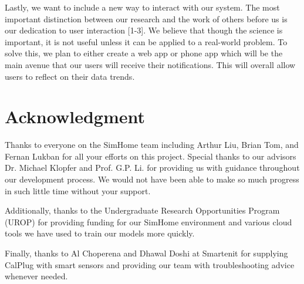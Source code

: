 \documentclass[conference]{IEEEtran}
\begin{document}
Lastly, we want to include a new way to interact with our system. The most important distinction between our research and the work of others before us is our dedication to user interaction [1-3]. We believe that though the science is important, it is not useful unless it can be applied to a real-world problem. To solve this, we plan to either create a web app or phone app which will be the main avenue that our users will receive their notifications. This will overall allow users to reflect on their data trends.

\section*{Acknowledgment}
Thanks to everyone on the SimHome team including Arthur Liu, Brian Tom, and Fernan Lukban for all your efforts on this project. Special thanks to our advisors Dr. Michael Klopfer and Prof. G.P. Li. for providing us with guidance throughout our development process. We would not have been able to make so much progress in such little time without your support.

Additionally, thanks to the Undergraduate Research Opportunities Program (UROP) for providing funding for our SimHome environment and various cloud tools we have used to train our models more quickly.

Finally, thanks to Al Choperena and Dhawal Doshi at Smartenit for supplying CalPlug with smart sensors and providing our team with troubleshooting advice whenever needed.



\end{document}
